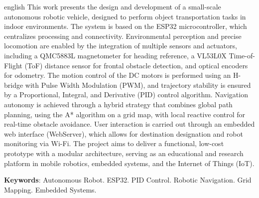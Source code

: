 \documentclass[	12pt, Times, openright, twoside, a4paper, english, brazil]{abntex2}
\begin{document}
\begin{resumo}[Abstract]
	\begin{otherlanguage*}{english}
		This work presents the design and development of a small-scale autonomous robotic vehicle, designed to perform object transportation tasks in indoor environments. The system is based on the ESP32 microcontroller, which centralizes processing and connectivity. Environmental perception and precise locomotion are enabled by the integration of multiple sensors and actuators, including a QMC5883L magnetometer for heading reference, a VL53L0X Time-of-Flight (ToF) distance sensor for frontal obstacle detection, and optical encoders for odometry. The motion control of the DC motors is performed using an H-bridge with Pulse Width Modulation (PWM), and trajectory stability is ensured by a Proportional, Integral, and Derivative (PID) control algorithm. Navigation autonomy is achieved through a hybrid strategy that combines global path planning, using the A* algorithm on a grid map, with local reactive control for real-time obstacle avoidance. User interaction is carried out through an embedded web interface (WebServer), which allows for destination designation and robot monitoring via Wi-Fi. The project aims to deliver a functional, low-cost prototype with a modular architecture, serving as an educational and research platform in mobile robotics, embedded systems, and the Internet of Things (IoT).
		\vspace{\onelineskip}

		\noindent
		\textbf{Keywords}: Autonomous Robot. ESP32. PID Control. Robotic Navigation. Grid Mapping. Embedded Systems.
	\end{otherlanguage*}
\end{resumo}

\listoffigures*
\cleardoublepage

\end{document}

